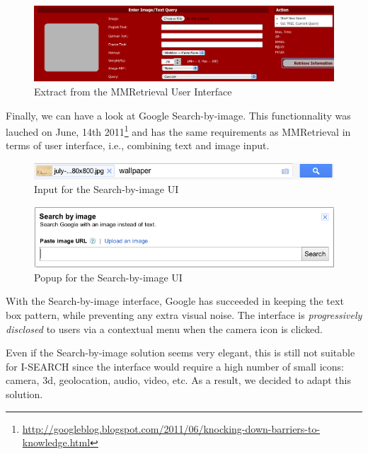\documentclass[runningheads,a4paper]{llncs}
\begin{document}
\begin{figure}[h!]
  \centering
    \includegraphics[width=0.8\linewidth]{resources/mmretrieval-UI.png}
  \caption{Extract from the MMRetrieval User Interface}
  \label{fig:mmretrieval-ui}
\end{figure}

Finally, we can have a look at Google Search-by-image. This functionnality was lauched on June, 14th 2011\footnote{\url{http://googleblog.blogspot.com/2011/06/knocking-down-barriers-to-knowledge.html}} and has the same requirements as MMRetrieval in terms of user interface, i.e., combining text and image input. 

\begin{figure}[h!]
  \centering
    \includegraphics[width=0.8\linewidth]{resources/search-by-image-UI-box.png}
  \caption{Input for the Search-by-image UI}
  \label{fig:search-by-image-box}
\end{figure}

\begin{figure}[h!]
  \centering
    \includegraphics[width=0.8\linewidth]{resources/search-by-image-UI-popup.png}
  \caption{Popup for the Search-by-image UI}
  \label{fig:search-by-image-popup}
\end{figure}

With the Search-by-image interface, Google has succeeded in keeping the text box pattern, while preventing any extra visual noise. The interface is \emph{progressively disclosed} to users via a contextual menu when the camera icon is clicked.

Even if the Search-by-image solution seems very elegant, this is still not suitable for I-SEARCH since the interface would require a high number of small icons: camera, 3d, geolocation, audio, video, etc.  As a result, we decided to adapt this solution. 
\end{document}

